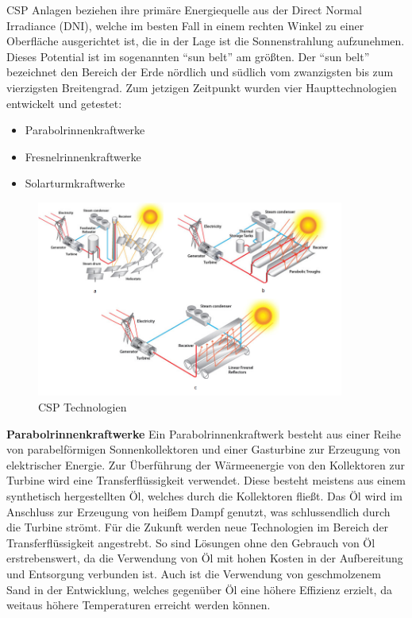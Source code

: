 CSP Anlagen beziehen ihre primäre Energiequelle aus der Direct Normal Irradiance (DNI), welche im besten Fall in einem rechten Winkel zu einer Oberfläche ausgerichtet ist, die in der Lage ist die Sonnenstrahlung aufzunehmen. Dieses Potential ist im sogenannten "`sun belt"' am größten. Der "`sun belt"' bezeichnet den Bereich der Erde nördlich und südlich vom zwanzigsten bis zum vierzigsten Breitengrad. Zum jetzigen Zeitpunkt wurden vier Haupttechnologien entwickelt und getestet:

\begin{itemize}
	\item Parabolrinnenkraftwerke
	\item Fresnelrinnenkraftwerke
	\item Solarturmkraftwerke
\end{itemize}

\begin{figure}[H]
	\centering
	\includegraphics[width=0.9\textwidth]{technik.png}
	\caption{CSP Technologien}
	\label{fig:technik}
\end{figure}

\textbf{Parabolrinnenkraftwerke}
\newline
Ein Parabolrinnenkraftwerk besteht aus einer Reihe von parabelförmigen Sonnenkollektoren und einer Gasturbine zur Erzeugung von elektrischer Energie. Zur Überführung der Wärmeenergie von den Kollektoren zur Turbine wird eine Transferflüssigkeit verwendet. Diese besteht meistens aus einem synthetisch hergestellten Öl, welches durch die Kollektoren fließt. Das Öl wird im Anschluss zur Erzeugung von heißem Dampf genutzt, was schlussendlich durch die Turbine strömt. Für die Zukunft werden neue Technologien im Bereich der Transferflüssigkeit angestrebt. So sind Lösungen ohne den Gebrauch von Öl erstrebenswert, da die Verwendung von Öl mit hohen Kosten in der Aufbereitung und Entsorgung verbunden ist. Auch ist die Verwendung von geschmolzenem Sand in der Entwicklung, welches gegenüber Öl eine höhere Effizienz erzielt, da weitaus höhere Temperaturen erreicht werden können.

